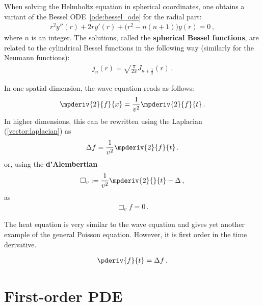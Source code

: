     When solving the Helmholtz equation in spherical coordinates, one obtains a variant of the Bessel ODE~\eqref{ode:bessel_ode} for the radial part:
    \begin{gather}
        r^2y''(r) + 2ry'(r) + \bigl(r^2 - n(n+1)\bigr)y(r) = 0\,,
    \end{gather}
    where $n$ is an integer. The solutions, called the \textbf{spherical Bessel functions}, are related to the cylindrical Bessel functions in the following way (similarly for the Neumann functions):
    \begin{gather}
        j_n(r) = \sqrt{\frac{\pi}{2x}}J_{n + \frac{1}{2}}(r)\,.
    \end{gather}

    \begin{example}\label{optics:wave_equation}
        In one spatial dimension, the wave equation reads as follows:
        \begin{gather}
            \mpderiv{2}{f}{x} = \frac{1}{v^2}\mpderiv{2}{f}{t}\,.
        \end{gather}
        In higher dimensions, this can be rewritten using the Laplacian (\cref{vector:laplacian}) as
        \begin{gather}
            \Delta f = \frac{1}{v^2}\mpderiv{2}{f}{t}\,.
        \end{gather}
        or, using the \textbf{d'Alembertian}
        \begin{gather}
            \Box_v := \frac{1}{v^2}\mpderiv{2}{}{t}-\Delta\,,
        \end{gather}
        as
        \begin{gather}
            \Box_v f = 0\,.
        \end{gather}
    \end{example}

    The heat equation is very similar to the wave equation and gives yet another example of the general Poisson equation. However, it is first order in the time derivative.
    \begin{example}\label{pde:heat_equation}
        \begin{gather}
            \pderiv{f}{t} = \Delta f\,.
        \end{gather}
    \end{example}

\section{First-order PDE}

